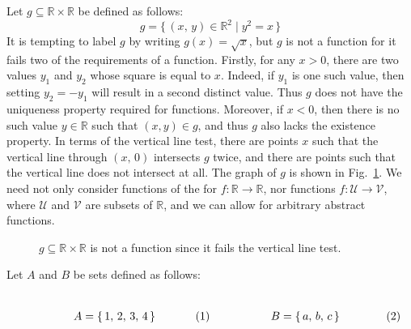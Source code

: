         Let $g\subseteq\mathbb{R}\times\mathbb{R}$ be defined as follows:
        \begin{equation}
            g=\big\{\,(x,\,y)\in\mathbb{R}^{2}\;|\;y^{2}=x\,\big\}
        \end{equation}
        It is tempting to label $g$ by writing $g(x)=\sqrt{x}$, but $g$ is
        not a function for it fails two of the requirements of a function.
        Firstly, for any $x>0$, there are two values $y_{1}$ and $y_{2}$
        whose square is equal to $x$. Indeed, if $y_{1}$ is one such value,
        then setting $y_{2}=\minus{y}_{1}$ will result in a second
        distinct value. Thus $g$ does not have the uniqueness property
        required for functions. Moreover, if $x<0$, then there is no such
        value $y\in\mathbb{R}$ such that $(x,y)\in{g}$, and thus $g$ also
        lacks the existence property. In terms of the vertical line test,
        there are points $x$ such that the vertical line through
        $(x,\,0)$ intersects $g$ twice, and there are points such that the
        vertical line does not intersect at all. The graph of $g$ is shown
        in Fig.~\ref{fig:SQRT_Not_a_Function}.
        We need not only consider functions of the for
        $f:\mathbb{R}\rightarrow\mathbb{R}$, nor functions
        $f:\mathcal{U}\rightarrow\mathcal{V}$, where $\mathcal{U}$ and
        $\mathcal{V}$ are subsets of $\mathbb{R}$, and we can allow for
        arbitrary abstract functions.
        \begin{figure}[H]
            \centering
            
            \caption[Example of a Non-Function]
                {$g\subseteq\mathbb{R}\times\mathbb{R}$ is not a function
                 since it fails the vertical line test.}
            \label{fig:SQRT_Not_a_Function}
        \end{figure}
        Let $A$ and $B$ be sets defined as follows:
        \par
        \begin{subequations}
            \begin{minipage}[b]{0.49\textwidth}
                \centering
                \begin{equation}
                    A=\{\,1,\,2,\,3,\,4\,\}
                \end{equation}
            \end{minipage}
            \hfill
            \begin{minipage}[b]{0.49\textwidth}
                \centering
                \begin{equation}
                    B=\{\,a,\,b,\,c\,\}
                \end{equation}
            \end{minipage}
        \end{subequations}
